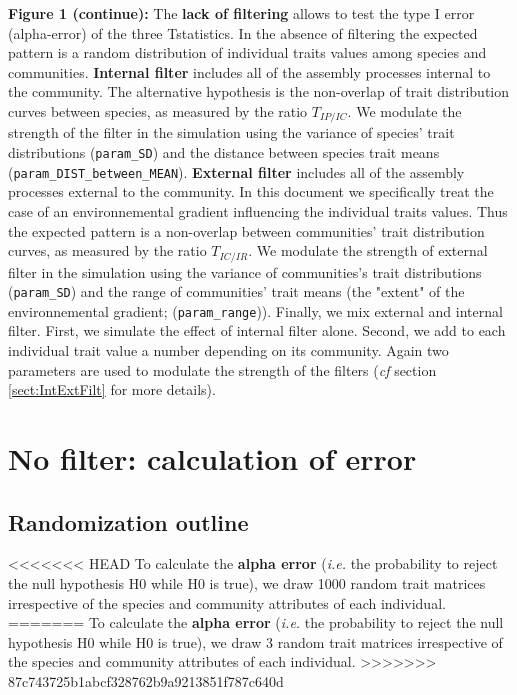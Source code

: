 \documentclass[12pt]{article}\usepackage[]{graphicx}\usepackage[]{color}
\begin{document}
\begin{landscape}
\clearpage
\textbf{Figure 1 (continue):} The \textbf{lack of filtering} allows to test the type I error (alpha-error) of the three Tstatistics. In the absence of filtering the expected pattern is a random distribution of individual traits values among species and communities.
\textbf{Internal filter} includes all of the assembly processes internal to the community. The alternative hypothesis is the non-overlap of trait distribution curves between species, as measured by the ratio $T_{IP/IC}$. We modulate the strength of the filter in the simulation using the variance of species' trait distributions (\texttt{param\_{}SD}) and the distance between species trait means (\texttt{param\_{}DIST\_{}between\_{}MEAN}). 
\textbf{External filter} includes all of the assembly processes external to the community. In this document we specifically treat the case of an environnemental gradient influencing the individual traits values. Thus the expected pattern is a non-overlap between communities' trait distribution curves, as measured by the ratio $T_{IC/IR}$. We modulate the strength of external filter in the simulation using the variance of communities's trait distributions (\texttt{param\_{}SD}) and the range of communities' trait means (the "extent" of the environnemental gradient; (\texttt{param\_{}range})). 
Finally, we mix external and internal filter. First, we simulate the effect of internal filter alone. Second, we add to each individual trait value a number depending on its community. Again two parameters are used to modulate the strength of the filters (\textit{cf} section \ref{sect:IntExtFilt} for more details). 
\vspace*{1cm}


\cleardoublepage

\section{No filter: calculation of error}
 \subsection {Randomization outline}

<<<<<<< HEAD
To calculate the \textbf{alpha error} (\textit{i.e.} the probability to reject the null hypothesis H0 while H0 is true), we draw 1000 random trait matrices irrespective of the species and community attributes of each individual.
=======
To calculate the \textbf{alpha error} (\textit{i.e.} the probability to reject the null hypothesis H0 while H0 is true), we draw 3 random trait matrices irrespective of the species and community attributes of each individual.
>>>>>>> 87c743725b1abcf328762b9a9213851f787c640d


\end{landscape}
\end{document}
